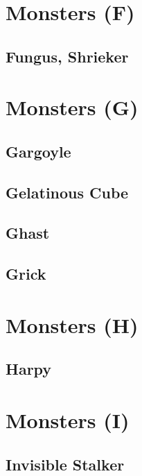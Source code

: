 \section{Monsters (F)}\label{sec:monster-f}

\subsection{Fungus, Shrieker}


\FloatBarrier
\section{Monsters (G)}\label{sec:monsters-g}

\subsection{Gargoyle}


\subsection{Gelatinous Cube}


\subsection{Ghast}


\subsection{Grick}


\FloatBarrier
\section{Monsters (H)}\label{sec:monsters-h}

\subsection{Harpy}


\FloatBarrier
\section{Monsters (I)}\label{sec:monsters-i}

\subsection{Invisible Stalker}


